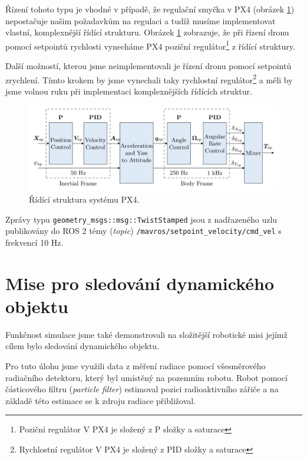 Řízení tohoto typu je vhodné v případě, že regulační smyčka v PX4 (obrázek \ref{fig:PX4controller}) nepostačuje našim požadavkům na regulaci a tudíž musíme implementovat vlastní, komplexnější řídící strukturu. Obrázek \ref{fig:PX4controller} zobrazuje, že při řízení dronu pomocí setpointů rychlosti vynecháme PX4 poziční regulátor\footnote{Poziční regulátor V PX4 je složený z P složky a saturace} z řídící struktury.

Další možností, kterou jsme neimplementovali je řízení dronu pomocí setpointů zrychlení. Tímto krokem by jsme vynechali taky rychlostní regulátor\footnote{Rychlostní regulátor V PX4 je složený z PID složky a saturace} a měli by jsme volnou ruku při implementaci komplexnějších řídících struktur.

\begin{figure}[!ht]
  \begin{center}
    \includegraphics[scale=0.44]{obrazky/PX4CONTROLLER}
  \end{center}
  \caption[Řídící struktura systému PX4]{Řídící struktura systému PX4. \cite{PX4docs}}
  \label{fig:PX4controller}
\end{figure}

Zprávy typu \texttt{geometry\_msgs::msg::TwistStamped} jsou z nadřazeného uzlu publikovány do ROS 2 témy (\textit{topic}) \texttt{/mavros/setpoint\_velocity/cmd\_vel} s frekvencí 10 Hz.

\section{Mise pro sledování dynamického objektu}

Funkčnost simulace jsme také demonstrovali na složitější robotické misi jejímž cílem bylo sledování dynamického objektu. 

Pro tuto úlohu jsme využili data z měření radiace pomocí všesměrového radiačního detektoru, který byl umístěný na pozemním robotu. Robot pomocí částicového filtru (\textit{particle filter}) estimoval pozici radioaktivního zářiče a na základě této estimace se k zdroju radiace přibližoval.

